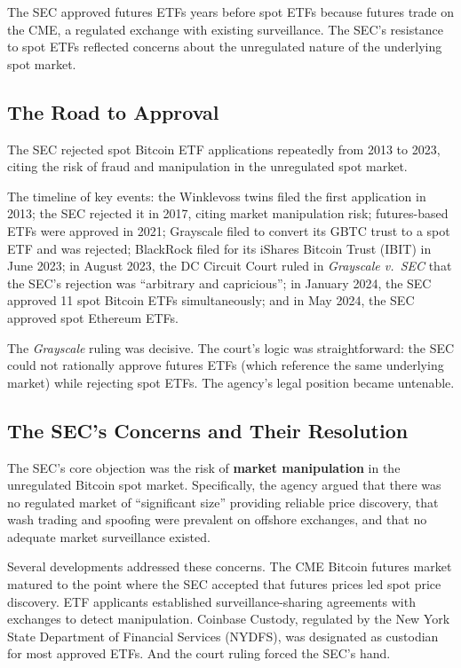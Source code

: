 \documentclass[11pt,a4paper]{article}
\newcommand{\keyword}[1]{\textbf{\textcolor{AccentOrange}{#1}}}
\begin{document}
The SEC approved futures ETFs years before spot ETFs because futures trade on the CME, a regulated exchange with existing surveillance. The SEC's resistance to spot ETFs reflected concerns about the unregulated nature of the underlying spot market.

\subsection{The Road to Approval}

The SEC rejected spot Bitcoin ETF applications repeatedly from 2013 to 2023, citing the risk of fraud and manipulation in the unregulated spot market.

The timeline of key events: the Winklevoss twins filed the first application in 2013; the SEC rejected it in 2017, citing market manipulation risk; futures-based ETFs were approved in 2021; Grayscale filed to convert its GBTC trust to a spot ETF and was rejected; BlackRock filed for its iShares Bitcoin Trust (IBIT) in June 2023; in August 2023, the DC Circuit Court ruled in \textit{Grayscale v.\ SEC} that the SEC's rejection was ``arbitrary and capricious''; in January 2024, the SEC approved 11 spot Bitcoin ETFs simultaneously; and in May 2024, the SEC approved spot Ethereum ETFs.

The \textit{Grayscale} ruling was decisive. The court's logic was straightforward: the SEC could not rationally approve futures ETFs (which reference the same underlying market) while rejecting spot ETFs. The agency's legal position became untenable.

\subsection{The SEC's Concerns and Their Resolution}

The SEC's core objection was the risk of \keyword{market manipulation} in the unregulated Bitcoin spot market. Specifically, the agency argued that there was no regulated market of ``significant size'' providing reliable price discovery, that wash trading and spoofing were prevalent on offshore exchanges, and that no adequate market surveillance existed.

Several developments addressed these concerns. The CME Bitcoin futures market matured to the point where the SEC accepted that futures prices led spot price discovery. ETF applicants established surveillance-sharing agreements with exchanges to detect manipulation. Coinbase Custody, regulated by the New York State Department of Financial Services (NYDFS), was designated as custodian for most approved ETFs. And the court ruling forced the SEC's hand.
\end{document}
